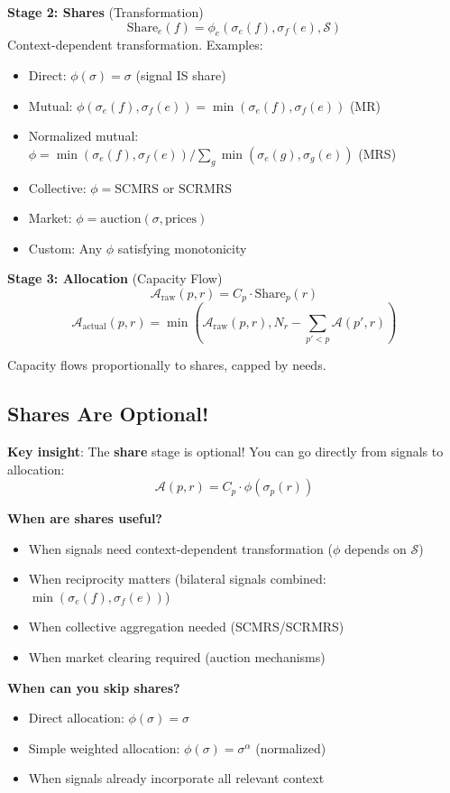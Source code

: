 \documentclass[11pt,a4paper]{article}
\theoremstyle{definition}
\theoremstyle{remark}
\begin{document}
\textbf{Stage 2: Shares} (Transformation)
\[ \text{Share}_e(f) = \phi_e(\sigma_e(f), \sigma_f(e), \mathcal{S}) \]
Context-dependent transformation. Examples:
\begin{itemize}
\item Direct: $\phi(\sigma) = \sigma$ (signal IS share)
\item Mutual: $\phi(\sigma_e(f), \sigma_f(e)) = \min(\sigma_e(f), \sigma_f(e))$ (MR)
\item Normalized mutual: $\phi = \min(\sigma_e(f), \sigma_f(e)) / \sum_g \min(\sigma_e(g), \sigma_g(e))$ (MRS)
\item Collective: $\phi = \text{SCMRS}$ or $\text{SCRMRS}$
\item Market: $\phi = \text{auction}(\sigma, \text{prices})$
\item Custom: Any $\phi$ satisfying monotonicity
\end{itemize}

\textbf{Stage 3: Allocation} (Capacity Flow)
\[ \mathcal{A}_{\text{raw}}(p,r) = C_p \cdot \text{Share}_p(r) \]
\[ \mathcal{A}_{\text{actual}}(p,r) = \min(\mathcal{A}_{\text{raw}}(p,r), N_r - \sum_{p'<p} \mathcal{A}(p',r)) \]

Capacity flows proportionally to shares, capped by needs.

\subsection{Shares Are Optional!}

\textbf{Key insight}: The \textbf{share} stage is optional! You can go directly from signals to allocation:
\[ \mathcal{A}(p,r) = C_p \cdot \phi(\sigma_p(r)) \]

\textbf{When are shares useful?}
\begin{itemize}
\item When signals need context-dependent transformation ($\phi$ depends on $\mathcal{S}$)
\item When reciprocity matters (bilateral signals combined: $\min(\sigma_e(f), \sigma_f(e))$)
\item When collective aggregation needed (SCMRS/SCRMRS)
\item When market clearing required (auction mechanisms)
\end{itemize}

\textbf{When can you skip shares?}
\begin{itemize}
\item Direct allocation: $\phi(\sigma) = \sigma$
\item Simple weighted allocation: $\phi(\sigma) = \sigma^\alpha$ (normalized)
\item When signals already incorporate all relevant context
\end{itemize}
\end{document}

